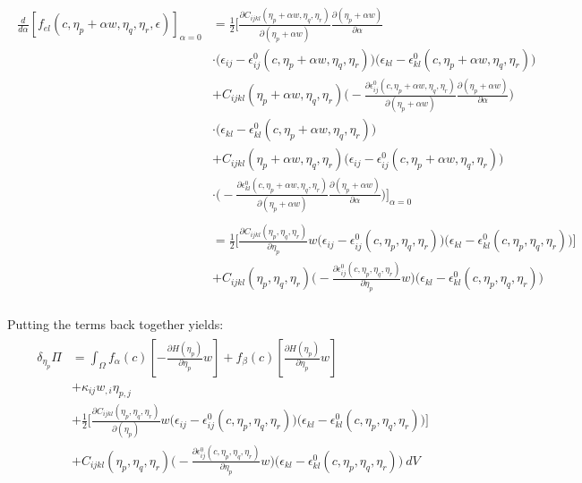 \documentclass[11pt]{article}
\renewcommand{\=}[1]{\stackrel{#1}{=}} %
\theoremstyle{definition}
\theoremstyle{remark}
\begin{document}
\begin{align}
\begin{split}
\frac{d}{d\alpha} \left[ f_{el}(c,\eta_p+\alpha w,\eta_q,\eta_r,\epsilon)\right]_{\alpha=0} &= \frac{1}{2}  \bigg[  \frac{\partial C_{ijkl}(\eta_p+\alpha w,\eta_q,\eta_r)}{\partial (\eta_p + \alpha w)} \frac{\partial(\eta_p + \alpha w)}{\partial \alpha} \\ 
&\cdot\big (\epsilon_{ij}-\epsilon_{ij}^0 (c,\eta_p+\alpha w,\eta_q,\eta_r)\big) \big(\epsilon_{kl}-\epsilon_{kl}^0 (c,\eta_p+\alpha w,\eta_q,\eta_r)\big) \\
&+ C_{ijkl}(\eta_p+\alpha w,\eta_q,\eta_r) \bigg (-\frac{\partial\epsilon_{ij}^0 (c,\eta_p+\alpha w,\eta_q,\eta_r)}{\partial (\eta_p + \alpha w)} \frac{\partial(\eta_p + \alpha w)}{\partial \alpha} \bigg) \\ &\cdot \big(\epsilon_{kl}-\epsilon_{kl}^0 (c,\eta_p+\alpha w,\eta_q,\eta_r)\big) \\
&+ C_{ijkl}(\eta_p+\alpha w,\eta_q,\eta_r)   \big(\epsilon_{ij}-\epsilon_{ij}^0 (c,\eta_p+\alpha w,\eta_q,\eta_r)\big) \\ 
&\cdot\bigg (-\frac{\partial\epsilon_{kl}^0 (c,\eta_p+\alpha w,\eta_q,\eta_r)}{\partial (\eta_p + \alpha w)} \frac{\partial(\eta_p + \alpha w)}{\partial \alpha} \bigg)\bigg]_{\alpha=0} \\
\\
&= \frac{1}{2}  \bigg[  \frac{\partial C_{ijkl}(\eta_p,\eta_q,\eta_r)}{\partial \eta_p} w \big(\epsilon_{ij}-\epsilon_{ij}^0 (c,\eta_p,\eta_q,\eta_r) \big) \big(\epsilon_{kl}-\epsilon_{kl}^0 (c,\eta_p,\eta_q,\eta_r) \big) \bigg] \\
&+ C_{ijkl}(\eta_p,\eta_q,\eta_r) \bigg (-\frac{\partial\epsilon_{ij}^0 (c,\eta_p,\eta_q,\eta_r)}{\partial \eta_p} w \bigg) \big(\epsilon_{kl}-\epsilon_{kl}^0 (c,\eta_p,\eta_q,\eta_r)\big) \\
\end{split}
\end{align}

Putting the terms back together yields:
\begin{gather}
\begin{split}
\delta_{\eta_p} \Pi  &=  \int_{\Omega}  f_{\alpha}(c) \left[  -\frac{\partial H(\eta_p)}{\partial \eta_p} w \right] +f_{\beta}(c) \left[  \frac{\partial H(\eta_p)}{\partial \eta_p } w \right] \\
&+ \kappa_{ij} w_{,i} \eta_{p,j} \\
&+\frac{1}{2}  \bigg[  \frac{\partial C_{ijkl}(\eta_p,\eta_q,\eta_r)}{\partial (\eta_p)} w \big(\epsilon_{ij}-\epsilon_{ij}^0 (c,\eta_p,\eta_q,\eta_r) \big) \big(\epsilon_{kl}-\epsilon_{kl}^0 (c,\eta_p,\eta_q,\eta_r) \big) \bigg] \\
&+ C_{ijkl}(\eta_p,\eta_q,\eta_r) \bigg (-\frac{\partial\epsilon_{ij}^0 (c,\eta_p,\eta_q,\eta_r)}{\partial \eta_p} w \bigg) \big(\epsilon_{kl}-\epsilon_{kl}^0 (c,\eta_p,\eta_q,\eta_r)\big)  ~dV  
\end{split}
\end{gather}
\end{document}
